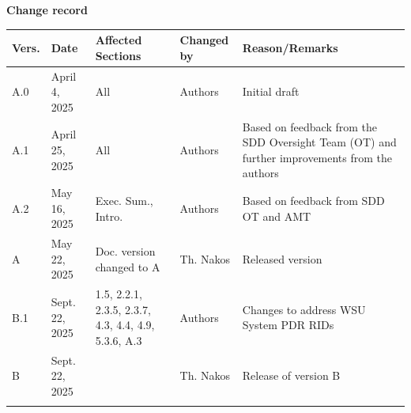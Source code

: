 \vspace*{-0.4cm}
\begin{center}
\textbf{\Large Change record}\\
\end{center}
\vspace*{1.0cm}


\begin{center} 
\label{tab:record_doc}
\begin{longtable*}[t]{|p{1.3cm}|p{1.8cm}|p{2.8cm}|p{2.2cm}|p{6.6cm}|}
\hline
    \textbf{Vers.} &  \textbf{Date}  &  \textbf{Affected Sections}  & \textbf{Changed by}   & \textbf{Reason/Remarks}   \\ \hline
    \endhead
       A.0         & April 4, 2025        & All                            & Authors               & Initial draft            \\ \hline
       A.1         & April 25, 2025       &  All                           & Authors               &        Based on feedback from the SDD Oversight Team (OT) and further improvements from the authors                   \\ \hline
       A.2         &  May 16,  2025       & Exec. Sum., Intro.            & Authors                & Based on feedback from SDD OT and AMT                         \\ \hline
       A            & May 22, 2025              &  Doc. version changed to A                                &      Th. Nakos                 &      Released version                    \\ \hline
       B.1      &    Sept. 22, 2025    &  1.5, 2.2.1, 2.3.5, 2.3.7, 4.3, 4.4, 4.9, 5.3.6, A.3                 & Authors               &   Changes to address WSU System PDR RIDs                         \\ \hline
       B         &  Sept. 22, 2025       &                  & Th. Nakos               & Release of version B                          \\ \hline
       
                   &               &                                &                       &                          \\ \hline
\end{longtable*}
\end{center} 



